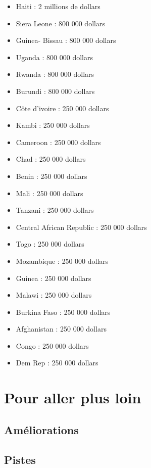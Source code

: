 \documentclass[
]{article}
\providecommand{\tightlist}{%
  \setlength{\itemsep}{0pt}\setlength{\parskip}{0pt}}
\begin{document}
\begin{itemize}
\tightlist
\item
  Haiti : 2 millions de dollars
\item
  Siera Leone : 800 000 dollars
\item
  Guinea- Bissau : 800 000 dollars
\item
  Uganda : 800 000 dollars
\item
  Rwanda : 800 000 dollars
\item
  Burundi : 800 000 dollars
\item
  Côte d'ivoire : 250 000 dollars
\item
  Kambi : 250 000 dollars
\item
  Cameroon : 250 000 dollars
\item
  Chad : 250 000 dollars
\item
  Benin : 250 000 dollars
\item
  Mali : 250 000 dollars
\item
  Tanzani : 250 000 dollars
\item
  Central African Republic : 250 000 dollars
\item
  Togo : 250 000 dollars
\item
  Mozambique : 250 000 dollars
\item
  Guinea : 250 000 dollars
\item
  Malawi : 250 000 dollars
\item
  Burkina Faso : 250 000 dollars
\item
  Afghanistan : 250 000 dollars
\item
  Congo : 250 000 dollars
\item
  Dem Rep : 250 000 dollars
\end{itemize}

\hypertarget{pour-aller-plus-loin}{%
\section{Pour aller plus loin}\label{pour-aller-plus-loin}}

\hypertarget{amuxe9liorations}{%
\subsection{Améliorations}\label{amuxe9liorations}}

\hypertarget{pistes}{%
\subsection{Pistes}\label{pistes}}
\end{document}
